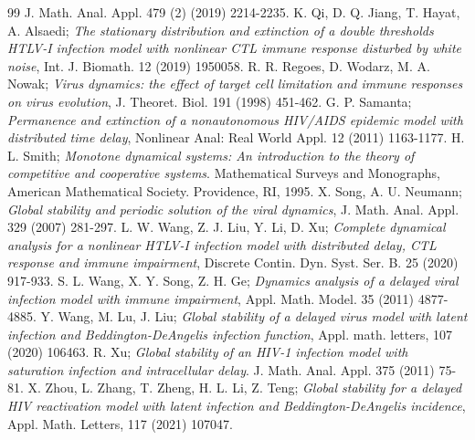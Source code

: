 \documentclass[10pt,a4paper]{amsart}
\numberwithin{equation}{section}
\begin{document}
\begin{thebibliography}{99}
J. Math. Anal. Appl. 479 (2) (2019) 2214-2235.
  K. Qi, D. Q. Jiang, T. Hayat,  A. Alsaedi;
\emph{The stationary distribution and extinction of a double thresholds HTLV-I 
infection model with nonlinear CTL immune response disturbed by white noise}, 
Int. J. Biomath. 12 (2019) 1950058.
  R. R. Regoes, D. Wodarz, M. A. Nowak;
\emph{Virus dynamics: the effect of target cell limitation and immune responses 
on virus evolution},  J. Theoret. Biol. 191 (1998) 451-462.
  G. P. Samanta;
\emph{Permanence and extinction of a nonautonomous HIV/AIDS epidemic model with 
distributed time delay}, Nonlinear Anal: Real World Appl.
 12 (2011) 1163-1177.
  H. L. Smith;
\emph{Monotone dynamical systems: An introduction to the theory of competitive and 
cooperative systems}. Mathematical Surveys and Monographs,
 American Mathematical Society.  Providence, RI, 1995.
  X. Song, A. U. Neumann;
\emph{Global stability and periodic solution of the viral dynamics}, 
J. Math. Anal. Appl. 329 (2007) 281-297.
  L. W. Wang, Z. J. Liu,  Y. Li, D. Xu;
\emph{Complete dynamical analysis for a nonlinear HTLV-I infection model with 
distributed delay, CTL response and immune impairment}, 
Discrete Contin. Dyn. Syst. Ser. B. 25 (2020) 917-933.
  S. L. Wang, X. Y. Song, Z. H. Ge;
\emph{Dynamics analysis of a delayed viral infection model with immune impairment}, 
Appl. Math. Model. 35 (2011) 4877-4885.
  Y. Wang, M. Lu, J. Liu;
\emph{Global stability of a delayed virus model with latent infection and 
Beddington-DeAngelis infection function}, 
Appl. math. letters, 107 (2020) 106463.
  R. Xu;
\emph{Global stability of an HIV-1 infection model with saturation infection and 
intracellular delay}. J. Math. Anal. Appl. 375 (2011)  75-81.
  X. Zhou, L. Zhang, T. Zheng, H. L. Li, Z. Teng;
\emph{Global stability for a delayed HIV reactivation model with latent infection and 
Beddington-DeAngelis incidence},
 Appl. Math. Letters, 117 (2021) 107047.
\end{thebibliography}
\end{document}
